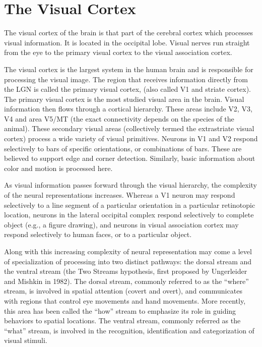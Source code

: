 \hypertarget{the-visual-cortex}{%
\section{The Visual Cortex}\label{the-visual-cortex}}

The visual cortex of the brain is that part of the cerebral cortex which processes visual information. It is located in the occipital lobe. Visual nerves run straight from the eye to the primary visual cortex to the visual association cortex.

The visual cortex is the largest system in the human brain and is responsible for processing the visual image. The region that receives information directly from the LGN is called the primary visual cortex, (also called V1 and striate cortex). The primary visual cortex is the most studied visual area in the brain. Visual information then flows through a cortical hierarchy. These areas include V2, V3, V4 and area V5/MT (the exact connectivity depends on the species of the animal). These secondary visual areas (collectively termed the extrastriate visual cortex) process a wide variety of visual primitives. Neurons in V1 and V2 respond selectively to bars of specific orientations, or combinations of bars. These are believed to support edge and corner detection. Similarly, basic information about color and motion is processed here.

As visual information passes forward through the visual hierarchy, the complexity of the neural representations increases. Whereas a V1 neuron may respond selectively to a line segment of a particular orientation in a particular retinotopic location, neurons in the lateral occipital complex respond selectively to complete object (e.g., a figure drawing), and neurons in visual association cortex may respond selectively to human faces, or to a particular object.

Along with this increasing complexity of neural representation may come a level of specialization of processing into two distinct pathways: the dorsal stream and the ventral stream (the Two Streams hypothesis, first proposed by Ungerleider and Mishkin in 1982). The dorsal stream, commonly referred to as the ``where'' stream, is involved in spatial attention (covert and overt), and communicates with regions that control eye movements and hand movements. More recently, this area has been called the ``how'' stream to emphasize its role in guiding behaviors to spatial locations. The ventral stream, commonly referred as the ``what'' stream, is involved in the recognition, identification and categorization of visual stimuli.

